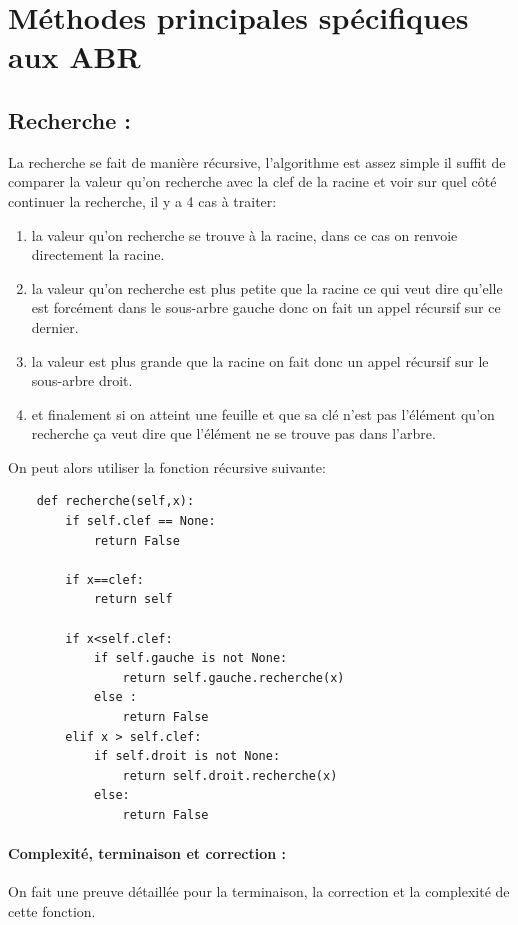 \documentclass{report}
\begin{document}
\section{Méthodes principales spécifiques aux ABR}
\subsection{Recherche :} 
La recherche se fait de manière récursive, l'algorithme est assez simple il suffit de comparer la valeur qu'on recherche avec la clef de la racine et voir sur quel côté continuer la recherche, il y a 4 cas à traiter:
\begin{enumerate}
	\item la valeur qu'on recherche se trouve à la racine, dans ce cas on renvoie directement la racine.
	\item la valeur qu'on recherche est plus petite que la racine ce qui veut dire qu'elle est forcément dans le sous-arbre gauche donc on fait un appel récursif sur ce dernier.
	\item la valeur est plus grande que la racine on fait donc un appel récursif sur le sous-arbre droit.
	\item et finalement si on atteint une feuille et que sa clé n'est pas l'élément qu'on recherche ça veut dire que l'élément ne se trouve pas dans l'arbre.
\end{enumerate}

On peut alors utiliser la fonction récursive suivante:
\begin{lstlisting}
	def recherche(self,x):
		if self.clef == None:
			return False

		if x==clef:
			return self
		
		if x<self.clef:
			if self.gauche is not None:
				return self.gauche.recherche(x)
			else :
				return False
		elif x > self.clef:
			if self.droit is not None:
				return self.droit.recherche(x)
			else: 
				return False
\end{lstlisting}

\paragraph{Complexité, terminaison et correction :} On fait une preuve détaillée pour la terminaison, la correction et la complexité de cette fonction.
\end{document}
